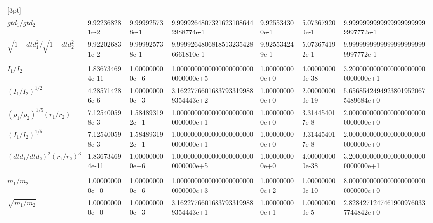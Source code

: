 \begin{table}[ht]
\begin{tabular}{@{} l l l l l l l @{}}
[3pt]\hline\\[-6pt]
$gtd_1/gtd_2$ & {\ttfamily 9.922368281e-2} & {\ttfamily 9.999925738e-1} & {\ttfamily 9.99992648073216231086442988774e-1} & {\ttfamily 9.925534300e-1} & {\ttfamily 5.073679200e-1} & {\ttfamily 9.99999999999999999999999997772e-1} \\
$\sqrt{1-dtd_1^2}/\sqrt{1-dtd_2^2}$ & {\ttfamily 9.922026831e-2} & {\ttfamily 9.999925738e-1} & {\ttfamily 9.99992648068185132354286661810e-1} & {\ttfamily 9.925534249e-1} & {\ttfamily 5.073674192e-1} & {\ttfamily 9.99999999999999999999999997772e-1} \\
[3pt]\hline\\[-6pt]
$I_1/I_2$ & {\ttfamily 1.836734694e-11} & {\ttfamily 1.000000000e+6} & {\ttfamily 1.00000000000000000000000000000e+5} & {\ttfamily 1.000000000e+0} & {\ttfamily 4.000000000e-38} & {\ttfamily 3.20000000000000000000000000000e+1} \\
$(I_1/I_2)^{1/2}$ & {\ttfamily 4.285714286e-6} & {\ttfamily 1.000000000e+3} & {\ttfamily 3.16227766016837933199889354443e+2} & {\ttfamily 1.000000000e+0} & {\ttfamily 2.000000000e-19} & {\ttfamily 5.65685424949238019520675489684e+0} \\
$(\rho_1/\rho_2)^{1/5}(r_1/r_2)$ & {\ttfamily 7.125400598e-3} & {\ttfamily 1.584893192e+1} & {\ttfamily 1.00000000000000000000000000000e+1} & {\ttfamily 1.000000000e+0} & {\ttfamily 3.314454017e-8} & {\ttfamily 2.00000000000000000000000000000e+0} \\
$(I_1/I_2)^{1/5}$ & {\ttfamily 7.125400598e-3} & {\ttfamily 1.584893192e+1} & {\ttfamily 1.00000000000000000000000000000e+1} & {\ttfamily 1.000000000e+0} & {\ttfamily 3.314454017e-8} & {\ttfamily 2.00000000000000000000000000000e+0} \\
$(dtd_1/dtd_2)^2(r_1/r_2)^3$ & {\ttfamily 1.836734694e-11} & {\ttfamily 1.000000000e+6} & {\ttfamily 1.00000000000000000000000000000e+5} & {\ttfamily 1.000000000e+0} & {\ttfamily 4.000000000e-38} & {\ttfamily 3.20000000000000000000000000000e+1} \\
[3pt]\hline\\[-6pt]
$m_1/m_2$ & {\ttfamily 1.000000000e+0} & {\ttfamily 1.000000000e+6} & {\ttfamily 1.00000000000000000000000000000e+3} & {\ttfamily 1.000000000e+2} & {\ttfamily 1.000000000e-10} & {\ttfamily 8.00000000000000000000000000000e+0} \\
$\sqrt{m_1/m_2}$ & {\ttfamily 1.000000000e+0} & {\ttfamily 1.000000000e+3} & {\ttfamily 3.16227766016837933199889354443e+1} & {\ttfamily 1.000000000e+1} & {\ttfamily 1.000000000e-5} & {\ttfamily 2.82842712474619009760337744842e+0} \\

\end{tabular}
\end{table}
